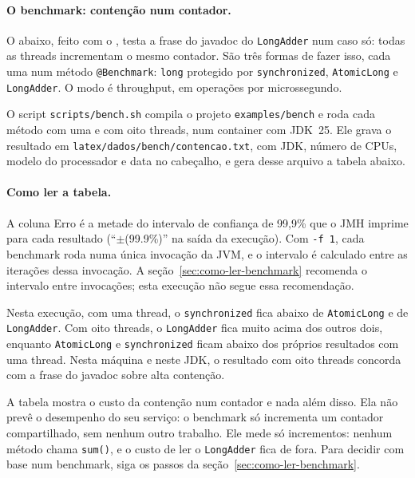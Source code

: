 \paragraph{O benchmark: contenção num contador.}
O  abaixo, feito com o
, testa a frase do javadoc do \texttt{LongAdder} num
caso só: todas as threads incrementam o mesmo contador. São três
formas de fazer isso, cada uma num método \texttt{@Benchmark}:
\texttt{long} protegido por \texttt{synchronized}, \texttt{AtomicLong}
e \texttt{LongAdder}. O modo é throughput, em operações por microssegundo.



O script \texttt{scripts/bench.sh} compila o projeto
\texttt{examples/bench} e roda cada método com uma e com oito threads,
num container com JDK~25. Ele grava o resultado em
\texttt{latex/dados/bench/contencao.txt}, com JDK, número de CPUs,
modelo do processador e data no cabeçalho, e gera desse arquivo a
tabela abaixo.

\begin{center}

\end{center}

\paragraph{Como ler a tabela.}
A coluna Erro é a metade do intervalo de confiança de 99{,}9\% que o
JMH imprime para cada resultado (\enquote{$\pm$(99.9\%)} na saída da
execução). Com \texttt{-f~1}, cada benchmark roda numa única invocação
da JVM, e o intervalo é calculado entre as iterações dessa invocação.
A seção~\ref{sec:como-ler-benchmark} recomenda o intervalo entre
invocações; esta execução não segue essa recomendação.

Nesta execução, com uma thread, o \texttt{synchronized} fica abaixo
de \texttt{AtomicLong} e de \texttt{LongAdder}. Com oito threads, o
\texttt{LongAdder} fica muito acima dos outros dois, enquanto
\texttt{AtomicLong} e \texttt{synchronized} ficam abaixo dos próprios
resultados com uma thread. Nesta máquina e neste JDK, o resultado com
oito threads concorda com a frase do javadoc sobre alta contenção.

A tabela mostra o custo da contenção num contador e nada além disso.
Ela não prevê o desempenho do seu serviço: o benchmark só incrementa
um contador compartilhado, sem nenhum outro trabalho. Ele mede só
incrementos: nenhum método chama \texttt{sum()}, e o custo de ler o
\texttt{LongAdder} fica de fora. Para decidir com base num
benchmark, siga os passos da seção~\ref{sec:como-ler-benchmark}.
